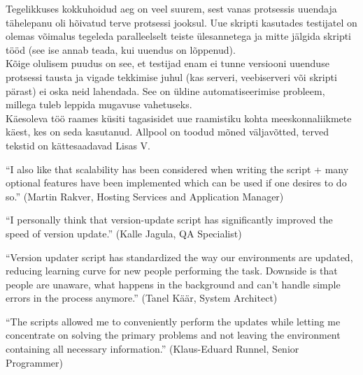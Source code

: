 \documentclass[12pt]{report}
\begin{document}
  Tegelikkuses kokkuhoidud aeg on veel suurem, sest vanas protsessis uuendaja tähelepanu oli hõivatud terve protsessi jooksul. Uue skripti kasutades testijatel on olemas võimalus tegeleda paralleelselt teiste ülesannetega ja mitte jälgida skripti tööd (see ise annab teada, kui uuendus on lõppenud).\\
  
  Kõige olulisem puudus on see, et testijad enam ei tunne versiooni uuenduse protsessi tausta ja vigade tekkimise juhul (kas serveri, veebiserveri või skripti pärast) ei oska neid lahendada. See on üldine automatiseerimise probleem, millega tuleb leppida mugavuse vahetuseks.\\
  
   Käesoleva töö raames küsiti tagasisidet uue raamistiku kohta meeskonnaliikmete käest, kes on seda kasutanud. Allpool on toodud mõned väljavõtted, terved tekstid on kättesaadavad Lisas V.\\
   
   \begin{displayquote}
   ``I also like that scalability has been considered when writing the script + many optional features have been implemented which can be used if one desires to do so.'' (Martin Rakver, Hosting Services and Application Manager)
   \end{displayquote}
   
   \begin{displayquote}
   ``I personally think that version-update script has significantly improved the speed of version update.'' (Kalle Jagula, QA Specialist)
   \end{displayquote}
   
   \begin{displayquote}
    ``Version updater script has standardized the way our environments are updated, reducing learning curve for new people performing the task. Downside is that people are unaware, what happens in the background and can't handle simple errors in the process anymore.'' (Tanel Käär, System Architect)
    \end{displayquote}
    
    \begin{displayquote}
    ``The scripts allowed me to conveniently perform the updates while letting me concentrate on solving the primary problems and not leaving the environment containing all necessary information.'' (Klaus-Eduard Runnel, Senior Programmer)
    \end{displayquote}
    
\end{document}
